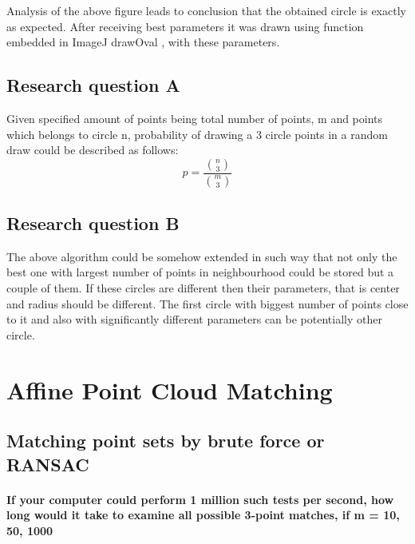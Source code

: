 \documentclass[notitlepage,english]{hgbreport}
\begin{document}
Analysis of the above figure leads to conclusion that the obtained circle is exactly as expected. After receiving best parameters it was drawn using function embedded in ImageJ drawOval , with these parameters.




\section {Research question A}

Given specified amount of points being total number of points, m and points which belongs to circle n, probability of drawing a 3 circle points in a random draw could be described as follows:
\[p=\frac{\binom{n}{3}}{\binom{m}{3}}\]


\section {Research question B}

The above algorithm could be somehow extended in such way that not only the best one with largest number of points in neighbourhood could be stored but a couple of them. If these circles are different then their parameters, that is center and radius should be different. The first circle with biggest number of points close to it and also with significantly different parameters can be potentially other circle. 




\chapter{Affine Point Cloud Matching}
\section {Matching point sets by brute force or RANSAC}
\subsubsection{If your computer could perform 1 million such tests per second, how long
would it take to examine all possible 3-point matches, if m = 10, 50, 1000}
\end{document}
